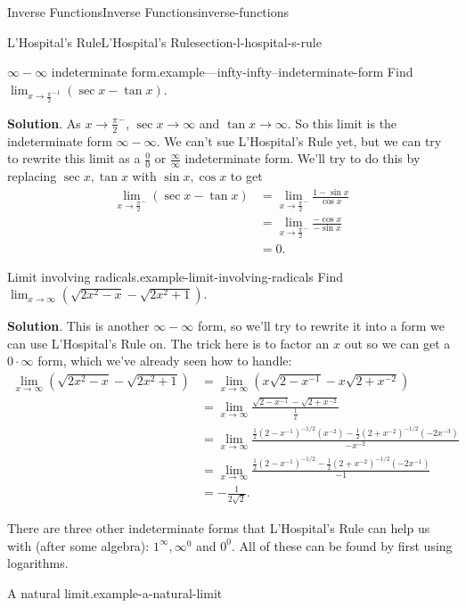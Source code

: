\documentclass[oneside,10pt,]{book}
\numberwithin{equation}{section}
\begin{document}
\begin{chapterptx}{Inverse Functions}{}{Inverse Functions}{}{}{inverse-functions}
\begin{sectionptx}{L'Hospital's Rule}{}{L'Hospital's Rule}{}{}{section-l-hospital-s-rule}
\begin{example}{\(\infty-\infty\) indeterminate form.}{example---infty-infty--indeterminate-form}
\hypertarget{p-301}{}%
Find \(\lim_{x\to\frac{\pi}{2}^{-1}}(\sec x-\tan x)\).%
\par\smallskip%
\noindent\textbf{Solution}.\hypertarget{solution-67}{}\quad%
\hypertarget{p-302}{}%
As \(x\to\frac{\pi}{2}^{-}\), \(\sec x\to\infty\) and \(\tan x\to\infty\). So this limit is the indeterminate form \(\infty-\infty\). We can't sue L'Hospital's Rule yet, but we can try to rewrite this limit as a \(\frac{0}{0}\) or \(\frac{\infty}{\infty}\) indeterminate form. We'll try to do this by replacing \(\sec x,\tan x\) with \(\sin x,\cos x\) to get%
\begin{align*}
\lim_{x\to\frac{\pi}{2}^{-}}(\sec x - \tan x) & =\lim_{x\to\frac{\pi}{2}^{-}}\frac{1-\sin x}{\cos x} \\
& = \lim_{x\to\frac{\pi}{2}^{-}}\frac{-\cos x}{-\sin x} \\
& = 0. 
\end{align*}
%
\end{example}
\begin{example}{Limit involving radicals.}{example-limit-involving-radicals}%
\hypertarget{p-303}{}%
Find \(\lim_{x\to\infty}(\sqrt{2x^{2} - x} - \sqrt{2x^{2}+1})\).%
\par\smallskip%
\noindent\textbf{Solution}.\hypertarget{solution-68}{}\quad%
\hypertarget{p-304}{}%
This is another \(\infty-\infty\) form, so we'll try to rewrite it into a form we can use L'Hospital's Rule on. The trick here is to factor an \(x\) out so we can get a \(0\cdot\infty\) form, which we've already seen how to handle:%
\begin{align*}
\lim_{x\to\infty}(\sqrt{2x^{2} - x} - \sqrt{2x^{2} + 1}) & = \lim_{x\to\infty}(x\sqrt{2 - x^{-1}} - x\sqrt{2+x^{-2}}) \\
& = \lim_{x\to\infty}\frac{\sqrt{2 - x^{-1}} - \sqrt{2+x^{-2}}}{\frac{1}{x}} \\
& = \lim_{x\to\infty}\frac{\frac{1}{2}(2-x^{-1})^{-1/2}(x^{-2}) - \frac{1}{2}(2+x^{-2})^{-1/2}(-2x^{-3})}{-x^{-2}} \\
& = \lim_{x\to\infty}\frac{\frac{1}{2}(2 - x^{-1})^{-1/2} - \frac{1}{2}(2+x^{-2})^{-1/2}(-2x^{-1})}{-1} \\
& = -\frac{1}{2\sqrt{2}}.
\end{align*}
%
\end{example}
\hypertarget{p-305}{}%
There are three other indeterminate forms that L'Hospital's Rule can help us with (after some algebra): \(1^{\infty}, \infty^{0}\) and \(0^{0}\). All of these can be found by first using logarithms.%
\begin{example}{A natural limit.}{example-a-natural-limit}%

\end{example}
\end{sectionptx}
\end{chapterptx}
\end{document}
